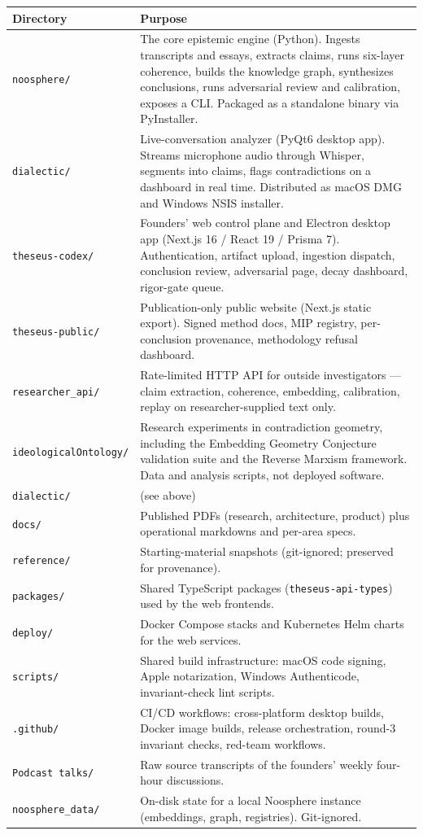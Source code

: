 \documentclass[11pt,letterpaper]{article}
\newcommand{\file}[1]{\texttt{#1}}
\begin{document}
\begin{longtable}{p{3.4cm} p{11.1cm}}
\toprule
\textbf{Directory} & \textbf{Purpose} \\
\midrule
\endhead
\file{noosphere/}            & The core epistemic engine (Python). Ingests transcripts and essays, extracts claims, runs six-layer coherence, builds the knowledge graph, synthesizes conclusions, runs adversarial review and calibration, exposes a CLI. Packaged as a standalone binary via PyInstaller. \\
\file{dialectic/}            & Live-conversation analyzer (PyQt6 desktop app). Streams microphone audio through Whisper, segments into claims, flags contradictions on a dashboard in real time. Distributed as macOS DMG and Windows NSIS installer. \\
\file{theseus-codex/}        & Founders' web control plane and Electron desktop app (Next.js 16 / React 19 / Prisma 7). Authentication, artifact upload, ingestion dispatch, conclusion review, adversarial page, decay dashboard, rigor-gate queue. \\
\file{theseus-public/}       & Publication-only public website (Next.js static export). Signed method docs, MIP registry, per-conclusion provenance, methodology refusal dashboard. \\
\file{researcher\_api/}      & Rate-limited HTTP API for outside investigators --- claim extraction, coherence, embedding, calibration, replay on researcher-supplied text only. \\
\file{ideologicalOntology/}  & Research experiments in contradiction geometry, including the Embedding Geometry Conjecture validation suite and the Reverse Marxism framework. Data and analysis scripts, not deployed software. \\
\file{dialectic/}            & (see above) \\
\file{docs/}                 & Published PDFs (research, architecture, product) plus operational markdowns and per-area specs. \\
\file{reference/}            & Starting-material snapshots (git-ignored; preserved for provenance). \\
\file{packages/}             & Shared TypeScript packages (\texttt{theseus-api-types}) used by the web frontends. \\
\file{deploy/}               & Docker Compose stacks and Kubernetes Helm charts for the web services. \\
\file{scripts/}              & Shared build infrastructure: macOS code signing, Apple notarization, Windows Authenticode, invariant-check lint scripts. \\
\file{.github/}              & CI/CD workflows: cross-platform desktop builds, Docker image builds, release orchestration, round-3 invariant checks, red-team workflows. \\
\file{Podcast talks/}        & Raw source transcripts of the founders' weekly four-hour discussions. \\
\file{noosphere\_data/}      & On-disk state for a local Noosphere instance (embeddings, graph, registries). Git-ignored. \\
\bottomrule
\end{longtable}
\end{document}
